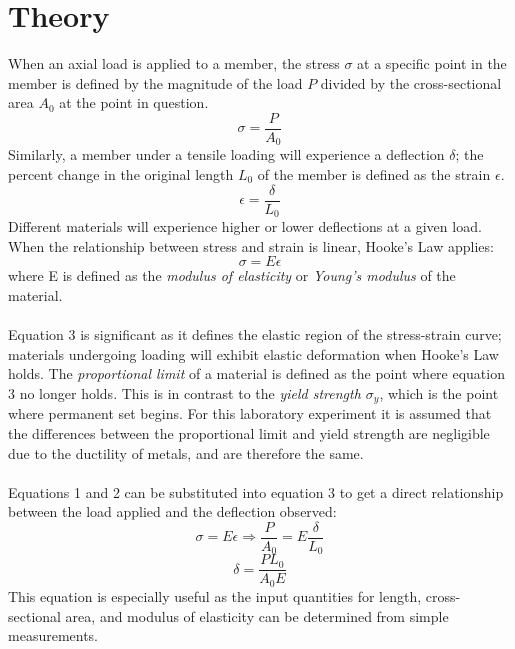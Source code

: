 \documentclass{article}
\begin{document}
    \section{Theory}
    \noindent When an axial load is applied to a member, the stress $\sigma$ at a specific point in the member is defined by the magnitude of the load $P$ divided by the cross-sectional area $A_{0}$ at the point in question. 
	\begin{equation}
	    \sigma = \frac{P}{A_{0}}
	\end{equation}
	Similarly, a member under a tensile loading will experience a deflection $\delta$; the percent change in the original length $L_{0}$ of the member is defined as the strain $\epsilon$. 
    \begin{equation}
        \epsilon = \frac{\delta}{L_{0}}
    \end{equation}
    Different materials will experience higher or lower deflections at a given load. When the relationship between stress and strain is linear, Hooke's Law applies: 
    \begin{equation}
        \sigma = E \epsilon 
    \end{equation}
    where E is defined as the \emph{modulus of elasticity} or \emph{Young's modulus} of the material. \\\\Equation 3 is significant as it defines the elastic region of the stress-strain curve; materials undergoing loading will exhibit elastic deformation when Hooke's Law holds. The \emph{proportional limit} of a material is defined as the point where equation 3 no longer holds. This is in contrast to the \emph{yield strength $\sigma_{y}$}, which is the point where permanent set begins. For this laboratory experiment it is assumed that the differences between the proportional limit and yield strength are negligible due to the ductility of metals, and are therefore the same.\\\\
    Equations 1 and 2 can be substituted into equation 3 to get a direct relationship between the load applied and the deflection observed:
    \[\sigma = E \epsilon \Rightarrow \frac{P}{A_{0}} = E \frac{\delta}{L_{0}}\]
    \begin{equation}
        \delta = \frac{P L_{0}}{A_{0} E}
    \end{equation}
    This equation is especially useful as the input quantities for length, cross-sectional area, and modulus of elasticity can be determined from simple measurements.\\\\
\end{document}
